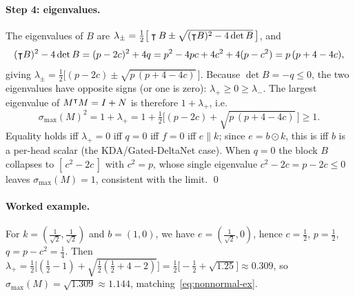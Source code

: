 \documentclass[11pt,letterpaper,logo]{yalearxiv}
\newcommand{\smax}{\sigma_{\max}}
\begin{document}
\paragraph{Step 4: eigenvalues.}
The eigenvalues of $B$ are
$\lambda_\pm = \tfrac12\big[\intercal B \pm \sqrt{(\intercal B)^2 - 4\det B}\,\big]$, and
\begin{equation*}
  (\intercal B)^2 - 4\det B = (p-2c)^2 + 4q = p^2 - 4pc + 4c^2 + 4(p - c^2) = p\,(p + 4 - 4c),
\end{equation*}
giving $\lambda_\pm = \tfrac12\big[(p-2c) \pm \sqrt{p\,(p+4-4c)}\,\big]$. Because
$\det B = -q \le 0$, the two eigenvalues have opposite signs (or one is zero):
$\lambda_+ \ge 0 \ge \lambda_-$. The largest eigenvalue of $M^{\intercal}M = I + N$ is
therefore $1 + \lambda_+$, i.e.
\begin{equation*}
  \smax(M)^2 = 1 + \lambda_+ = 1 + \tfrac12\big[(p-2c) + \sqrt{p\,(p+4-4c)}\,\big] \ge 1 .
\end{equation*}
Equality holds iff $\lambda_+ = 0$ iff $q = 0$ iff $f = 0$ iff $e \parallel k$; since
$e = b\odot k$, this is iff $b$ is a per-head scalar (the KDA/Gated-DeltaNet case). When
$q = 0$ the block $B$ collapses to $[\,c^2 - 2c\,]$ with $c^2 = p$, whose single
eigenvalue $c^2 - 2c = p - 2c \le 0$ leaves $\smax(M) = 1$, consistent with the limit.
\qed

\paragraph{Worked example.}
For $k = (\tfrac1{\sqrt2},\tfrac1{\sqrt2})$ and $b = (1,0)$, we have
$e = (\tfrac1{\sqrt2}, 0)$, hence $c = \tfrac12$, $p = \tfrac12$, $q = p - c^2 = \tfrac14$.
Then $\lambda_+ = \tfrac12\big[(\tfrac12 - 1) + \sqrt{\tfrac12(\tfrac12 + 4 - 2)}\big]
= \tfrac12\big[-\tfrac12 + \sqrt{1.25}\big] \approx 0.309$, so
$\smax(M) = \sqrt{1.309} \approx 1.144$, matching~\eqref{eq:nonnormal-ex}.



\end{document}
